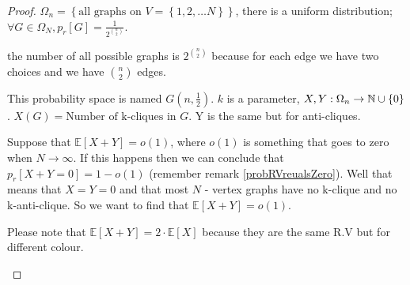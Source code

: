 \begin{proof}
$\Omega_{n}=\left\{ \text{all graphs on }V=\left\{ 1,2,\dots N\right\} \right\} $,
there is a uniform distribution; $\forall G\in\Omega_{N},p_{r}\left[G\right]=\frac{1}{2^{\binom{n}{2}}}$.
\begin{remark}
the number of all possible graphs is $2^{\binom{n}{2}}$ because for
each edge we have two choices and we have $\binom{n}{2}$ edges.
\end{remark}

This probability space is named $G\left(n,\frac{1}{2}\right)$. $k$
is a parameter, $X,Y:\Omega_{n}\to\mathbb{N}\cup\left\{ 0\right\} $. $X\left(G\right)=\text{Number of k-cliques in }G$.
Y is the same but for anti-cliques.
\begin{proposition}
Suppose that $\mathbb{E}\left[X+Y\right]=o\left(1\right)$, where
$o\left(1\right)$ is something that goes to zero when $N\to\infty$.
If this happens then we can conclude that $p_{r}\left[X+Y=0\right]=1-o\left(1\right)$
(remember remark \ref{probRVreualsZero}). Well that means that $X=Y=0$
and that most $N$ - vertex graphs have no k-clique and no k-anti-clique.
So we want to find that $\mathbb{E}\left[X+Y\right]=o\left(1\right)$.
\begin{remark}
Please note that $\mathbb{E}\left[X+Y\right]=2\cdot\mathbb{E}\left[X\right]$
because they are the same R.V but for different colour.
\end{remark}

\end{proposition}


\end{proof}
